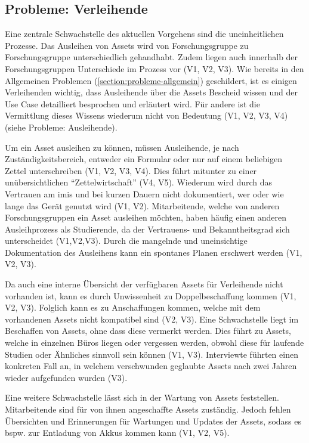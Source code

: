 \subsection{Probleme: Verleihende}
\label{section:probleme-verleihende}
Eine zentrale Schwachstelle des aktuellen Vorgehens sind die uneinheitlichen Prozesse. Das Ausleihen
von Assets wird von Forschungsgruppe zu Forschungsgruppe unterschiedlich gehandhabt. Zudem liegen
auch innerhalb der Forschungsgruppen Unterschiede im Prozess vor (V1, V2, V3). Wie bereits in den
Allgemeinen Problemen (\ref{section:probleme-allgemein}) geschildert, ist es einigen Verleihenden
wichtig, dass Ausleihende über die Assets Bescheid wissen und der Use Case detailliert besprochen
und erläutert wird. Für andere ist die Vermittlung dieses Wissens wiederum nicht von Bedeutung
(V1, V2, V3, V4) (siehe Probleme: Ausleihende).

Um ein Asset ausleihen zu können, müssen Ausleihende, je nach Zuständigkeitsbereich, entweder ein
Formular oder nur auf einem beliebigen Zettel unterschreiben (V1, V2, V3, V4). Dies führt mitunter
zu einer unübersichtlichen \enquote{Zettelwirtschaft} (V4, V5). Wiederum wird durch das Vertrauen am
\ac{imis} und bei kurzen Dauern nicht dokumentiert, wer oder wie lange das Gerät genutzt wird (V1,
V2). Mitarbeitende, welche von anderen Forschungsgruppen ein Asset ausleihen möchten, haben häufig
einen anderen Ausleihprozess als Studierende, da der Vertrauens- und Bekanntheitsgrad sich
unterscheidet (V1,V2,V3). Durch die mangelnde und uneinsichtige Dokumentation des Ausleihens kann
ein spontanes Planen erschwert werden (V1, V2, V3).

Da auch eine interne Übersicht der verfügbaren Assets für Verleihende nicht vorhanden ist, kann es
durch Unwissenheit zu Doppelbeschaffung kommen (V1, V2, V3). Folglich kann es zu Anschaffungen
kommen, welche mit dem vorhandenen Assets nicht kompatibel sind (V2, V3). Eine Schwachstelle liegt
im Beschaffen von Assets, ohne dass diese vermerkt werden. Dies führt zu Assets, welche in einzelnen
Büros liegen oder vergessen werden, obwohl diese für laufende Studien oder Ähnliches sinnvoll sein können
(V1, V3). Interviewte führten einen konkreten Fall an, in welchem verschwunden geglaubte Assets nach
zwei Jahren wieder aufgefunden wurden (V3).

Eine weitere Schwachstelle lässt sich in der Wartung von Assets feststellen. Mitarbeitende sind für
von ihnen angeschaffte Assets zuständig. Jedoch fehlen Übersichten und Erinnerungen für Wartungen
und Updates der Assets, sodass es bspw. zur Entladung von Akkus kommen kann (V1, V2, V5).


